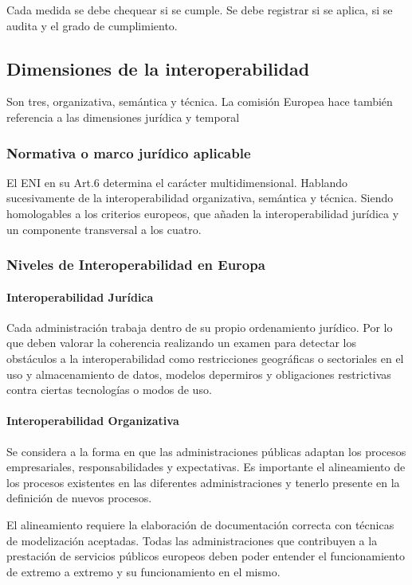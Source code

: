     Cada medida se debe chequear si se cumple. Se debe registrar si se aplica, si se audita y el grado de cumplimiento.

\subsection{Dimensiones de la interoperabilidad} %
    Son tres, organizativa, semántica y técnica. La comisión Europea hace también referencia a las dimensiones jurídica y temporal

    \subsubsection{Normativa o marco jurídico aplicable} %
        El ENI en su Art.6 determina el carácter multidimensional. Hablando sucesivamente de la interoperabilidad organizativa, semántica y técnica. Siendo homologables a los criterios europeos, que añaden la interoperabilidad jurídica y un componente transversal a los cuatro.

    \subsubsection{Niveles de Interoperabilidad en Europa} %
        \paragraph{Interoperabilidad Jurídica} %
            Cada administración trabaja dentro de su propio ordenamiento jurídico. Por lo que deben valorar la coherencia realizando un examen para detectar los obstáculos a la interoperabilidad como restricciones geográficas o sectoriales en el uso y almacenamiento de datos, modelos depermiros y obligaciones restrictivas contra ciertas tecnologías o modos de uso.

        \paragraph{Interoperabilidad Organizativa} %
            Se considera a la forma en que las administraciones públicas adaptan los procesos empresariales, responsabilidades y expectativas. Es importante el alineamiento de los procesos existentes en las diferentes administraciones y tenerlo presente en la definición de nuevos procesos.

            El alineamiento requiere la elaboración de documentación correcta con técnicas de modelización aceptadas. Todas las administraciones que contribuyen a la prestación de servicios públicos europeos deben poder entender el funcionamiento de extremo a extremo y su funcionamiento en el mismo.

